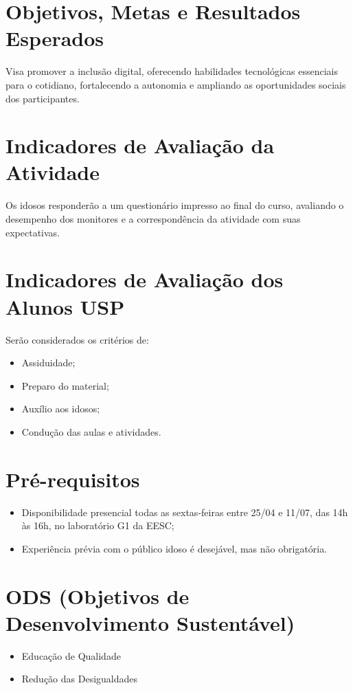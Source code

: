 \documentclass[a4paper,12pt]{article}
\begin{document}
\section*{Objetivos, Metas e Resultados Esperados}
Visa promover a inclusão digital, oferecendo habilidades tecnológicas essenciais para o cotidiano, fortalecendo a autonomia e ampliando as oportunidades sociais dos participantes.

\section*{Indicadores de Avaliação da Atividade}
Os idosos responderão a um questionário impresso ao final do curso, avaliando o desempenho dos monitores e a correspondência da atividade com suas expectativas.

\section*{Indicadores de Avaliação dos Alunos USP}
Serão considerados os critérios de:
\begin{itemize}
    \item Assiduidade;
    \item Preparo do material;
    \item Auxílio aos idosos;
    \item Condução das aulas e atividades.
\end{itemize}

\section*{Pré-requisitos}
\begin{itemize}
    \item Disponibilidade presencial todas as sextas-feiras entre 25/04 e 11/07, das 14h às 16h, no laboratório G1 da EESC;
    \item Experiência prévia com o público idoso é desejável, mas não obrigatória.
\end{itemize}

\section*{ODS (Objetivos de Desenvolvimento Sustentável)}
\begin{itemize}
    \item Educação de Qualidade
    \item Redução das Desigualdades
\end{itemize}
\end{document}
